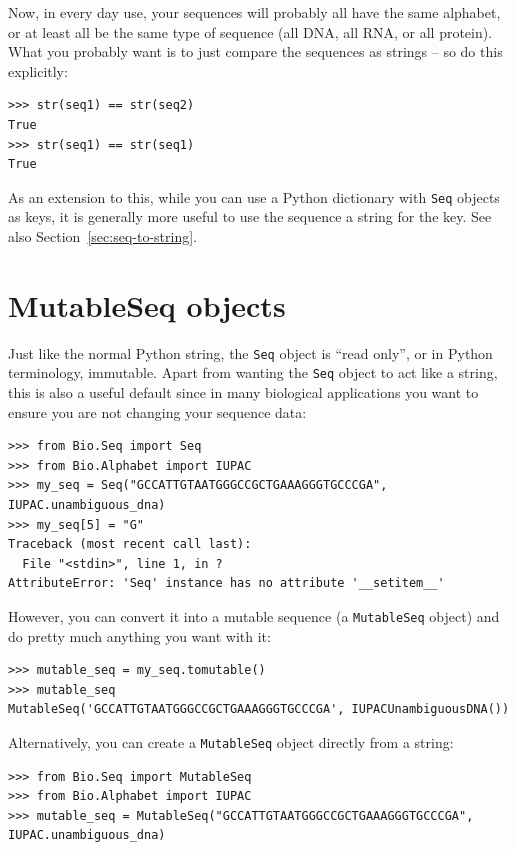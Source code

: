 \documentclass{report}
\begin{document}
Now, in every day use, your sequences will probably all have the same
alphabet, or at least all be the same type of sequence (all DNA, all RNA, or
all protein). What you probably want is to just compare the sequences as
strings -- so do this explicitly:

\begin{verbatim}
>>> str(seq1) == str(seq2)
True
>>> str(seq1) == str(seq1)
True
\end{verbatim}

\noindent As an extension to this, while you can use a Python dictionary with
\verb|Seq| objects as keys, it is generally more useful to use the sequence a
string for the key. See also Section~\ref{sec:seq-to-string}.

\section{MutableSeq objects}
\label{sec:mutable-seq}

Just like the normal Python string, the \verb|Seq| object is ``read only'', or in Python terminology, immutable.  Apart from wanting the \verb|Seq| object to act like a string, this is also a useful default since in many biological applications you want to ensure you are not changing your sequence data:

\begin{verbatim}
>>> from Bio.Seq import Seq
>>> from Bio.Alphabet import IUPAC
>>> my_seq = Seq("GCCATTGTAATGGGCCGCTGAAAGGGTGCCCGA", IUPAC.unambiguous_dna)
>>> my_seq[5] = "G"
Traceback (most recent call last):
  File "<stdin>", line 1, in ?
AttributeError: 'Seq' instance has no attribute '__setitem__'
\end{verbatim}

However, you can convert it into a mutable sequence (a \verb|MutableSeq| object) and do pretty much anything you want with it:

\begin{verbatim}
>>> mutable_seq = my_seq.tomutable()
>>> mutable_seq
MutableSeq('GCCATTGTAATGGGCCGCTGAAAGGGTGCCCGA', IUPACUnambiguousDNA())
\end{verbatim}

Alternatively, you can create a \verb|MutableSeq| object directly from a string:
\begin{verbatim}
>>> from Bio.Seq import MutableSeq
>>> from Bio.Alphabet import IUPAC
>>> mutable_seq = MutableSeq("GCCATTGTAATGGGCCGCTGAAAGGGTGCCCGA", IUPAC.unambiguous_dna)
\end{verbatim}
\end{document}
